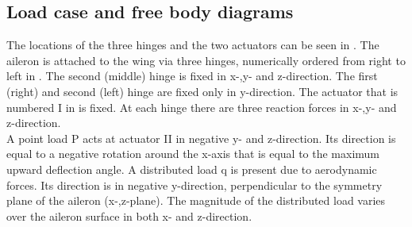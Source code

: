 \subsection{Load case and free body diagrams}
The locations of the three hinges and the two actuators can be seen in .
The aileron is attached to the wing via three hinges, numerically ordered from right to left in . The second (middle) hinge is fixed in x-,y- and z-direction.
The first (right) and second (left) hinge are fixed only in y-direction.
The actuator that is numbered I in  is fixed.
At each hinge there are three reaction forces in x-,y- and z-direction. \\

\noindent A point load P acts at actuator II in negative y- and z-direction. Its direction is equal to a negative rotation around the x-axis that is equal to the maximum upward deflection angle. 
A distributed load q is present due to aerodynamic forces. Its direction is in negative y-direction, perpendicular to the symmetry plane of the aileron (x-,z-plane). The magnitude of the distributed load varies over the aileron surface in both x- and z-direction. 

